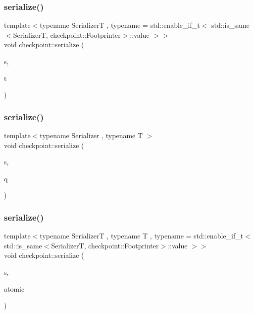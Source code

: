 \mbox{\label{namespacecheckpoint_ab9c05efe18a47d990fb20e84f73e9943}} 
\subsubsection{\texorpdfstring{serialize()}{serialize()}\hspace{0.1cm}{\footnotesize\ttfamily [5/30]}}
{\footnotesize\ttfamily template$<$typename SerializerT , typename  = std\+::enable\+\_\+if\+\_\+t$<$    std\+::is\+\_\+same$<$\+Serializer\+T, checkpoint\+::\+Footprinter$>$\+::value  $>$$>$ \\
void checkpoint\+::serialize (\begin{DoxyParamCaption}\item[{SerializerT \&}]{s,  }\item[{const std\+::thread \&}]{t }\end{DoxyParamCaption})}

\mbox{\label{namespacecheckpoint_a9493433bed418b54358130463961ce50}} 
\subsubsection{\texorpdfstring{serialize()}{serialize()}\hspace{0.1cm}{\footnotesize\ttfamily [6/30]}}
{\footnotesize\ttfamily template$<$typename Serializer , typename T $>$ \\
void checkpoint\+::serialize (\begin{DoxyParamCaption}\item[{Serializer \&}]{s,  }\item[{const std\+::priority\+\_\+queue$<$ T $>$ \&}]{q }\end{DoxyParamCaption})}

\mbox{\label{namespacecheckpoint_a40ca9a5c99807bd8a0610098d94b5125}} 
\subsubsection{\texorpdfstring{serialize()}{serialize()}\hspace{0.1cm}{\footnotesize\ttfamily [7/30]}}
{\footnotesize\ttfamily template$<$typename SerializerT , typename T , typename  = std\+::enable\+\_\+if\+\_\+t$<$    std\+::is\+\_\+same$<$\+Serializer\+T, checkpoint\+::\+Footprinter$>$\+::value  $>$$>$ \\
void checkpoint\+::serialize (\begin{DoxyParamCaption}\item[{SerializerT \&}]{s,  }\item[{const std\+::atomic$<$ T $>$ \&}]{atomic }\end{DoxyParamCaption})}


